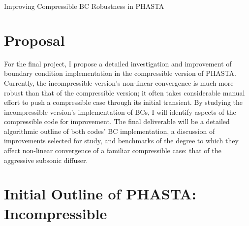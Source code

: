\documentclass[11pt]{article}
\begin{document}
{
	\fancyhf[LH]{\rightmark}
	\fancyhf[CH]{}
	\fancyhf[RH]{\thepage\hspace*{1ex}/\hspace*{1ex}\pageref{lastpage}}
	\fancyhf[LF]{}
	\fancyhf[CF]{}
	\fancyhf[RF]{}
}

{
	\fancyhf[CH]{}
	\fancyhf[LF]{}
	\fancyhf[CF]{}
	\fancyhf[RF]{}
}

\pagestyle{allpages}
\thispagestyle{firstpage}
\renewcommand{\sectionmark}[1]{ \markright{#1}{} }

\vspace*{0in}
\begin{center}
\LARGE Improving Compressible BC Robustness in PHASTA
\end{center}
\vspace*{0.3in}

\section{Proposal}

For the final project, I propose a detailed investigation and improvement of boundary condition implementation in the compressible version of PHASTA. Currently, the incompressible version's non-linear convergence is much more robust than that of the compressible version; it often takes considerable manual effort to push a compressible case through its initial transient. By studying the incompressible version's implementation of BCs, I will identify aspects of the compressible code for improvement. The final deliverable will be a detailed algorithmic outline of both codes' BC implementation, a discussion of improvements selected for study, and benchmarks of the degree to which they affect non-linear convergence of a familiar compressible case: that of the aggressive subsonic diffuser.

\section{Initial Outline of PHASTA: Incompressible}
\end{document}
